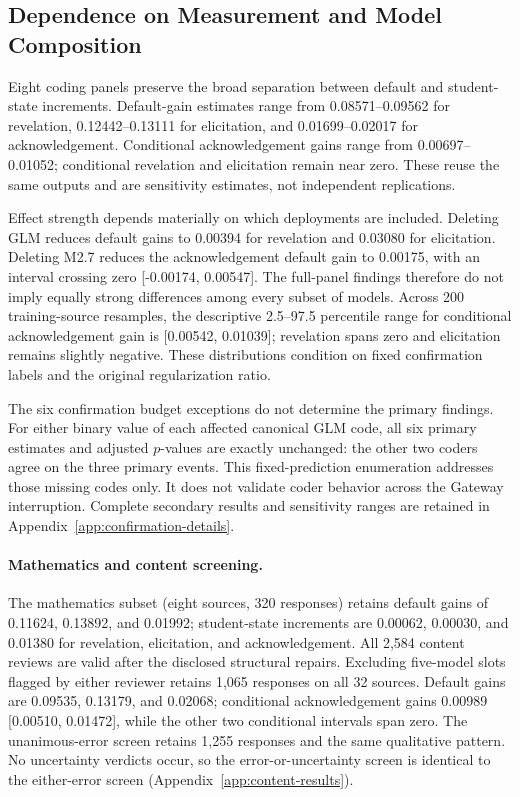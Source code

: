 \subsection{Dependence on Measurement and Model Composition}

Eight coding panels preserve the broad separation between default and
student-state increments. Default-gain estimates range from 0.08571--0.09562
for revelation, 0.12442--0.13111 for elicitation, and 0.01699--0.02017 for
acknowledgement. Conditional acknowledgement gains range from
0.00697--0.01052; conditional revelation and elicitation remain near zero.
These reuse the same outputs and are sensitivity estimates, not independent
replications.

Effect strength depends materially on which deployments are included.
Deleting GLM reduces default gains to 0.00394 for revelation and 0.03080 for
elicitation. Deleting M2.7 reduces the acknowledgement default gain to 0.00175,
with an interval crossing zero [-0.00174, 0.00547]. The full-panel findings
therefore do not imply equally strong differences among every subset of models.
Across 200 training-source resamples, the descriptive 2.5--97.5 percentile
range for conditional acknowledgement gain is [0.00542, 0.01039]; revelation
spans zero and elicitation remains slightly negative. These distributions
condition on fixed confirmation labels and the original regularization ratio.

The six confirmation budget exceptions do not determine the primary findings.
For either binary value of each affected canonical GLM code, all six primary
estimates and adjusted $p$-values are exactly unchanged: the other two coders
agree on the three primary events. This fixed-prediction enumeration addresses
those missing codes only. It does not validate coder behavior across the
Gateway interruption. Complete secondary results and sensitivity ranges are
retained in Appendix~\ref{app:confirmation-details}.

\paragraph{Mathematics and content screening.}
The mathematics subset (eight sources, 320 responses) retains default gains
of 0.11624, 0.13892, and 0.01992; student-state increments are 0.00062,
0.00030, and 0.01380 for revelation, elicitation, and acknowledgement.
All 2,584 content reviews are valid after the disclosed structural repairs.
Excluding five-model slots flagged by either reviewer retains 1,065 responses
on all 32 sources. Default gains are 0.09535, 0.13179, and 0.02068;
conditional acknowledgement gains 0.00989 [0.00510, 0.01472], while the
other two conditional intervals span zero. The unanimous-error screen retains
1,255 responses and the same qualitative pattern. No uncertainty verdicts
occur, so the error-or-uncertainty screen is identical to the either-error
screen (Appendix~\ref{app:content-results}).


